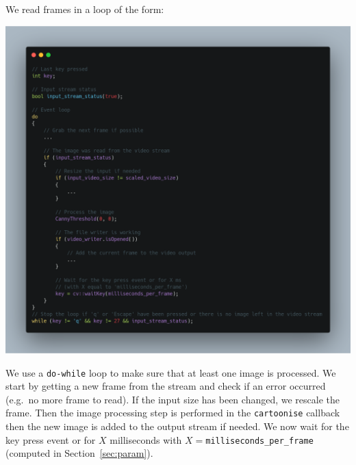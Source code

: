\documentclass[english,a4paper,12pt,oneside]{article}
\begin{document}
We read frames in a loop of the form:


% 
% 
%         
%     
%     
%     
\includegraphics[width=\linewidth]{carbon(9)}

We use a \verb+do-while+ loop to make sure that at least one image is processed. 
We start by getting a new frame from the stream and check if an error occurred (e.g.~no more frame to read). 
If the input size has been changed, we rescale the frame.
Then the image processing step is performed in the \verb+cartoonise+ callback then the new image is added to the output stream if needed. 
We now wait for the key press event or for $X$ milliseconds with $X=$\verb+milliseconds_per_frame+ (computed in Section~\ref{sec:param}).
\end{document}

